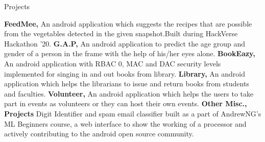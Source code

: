 \begin{rubric}{Projects}

\entry* \textbf{FeedMee,} An android application which suggests the recipes that are possible from the vegetables detected in the given snapshot.Built during HackVerse Hackathon '20.  
\entry* \textbf{G.A.P,} An android application to predict the age group and gender of a person in the frame with the help of his/her eyes alone.
\entry* \textbf{BookEazy,} An android application with RBAC 0, MAC and DAC security levels implemented for singing in and out books from library. 
\entry* \textbf{Library,} An android application which helps the librarians to issue and return books from students and faculties.
\entry* \textbf{Volunteer,} An android application which helps the users to take part in events as volunteers or they can host their own events.
\entry* \textbf{Other Misc., Projects} Digit Identifier and spam email classifier built as a part of AndrewNG's ML Beginners course, a web interface to show the working of a processor and actively contributing to the android open source community.
\end{rubric}